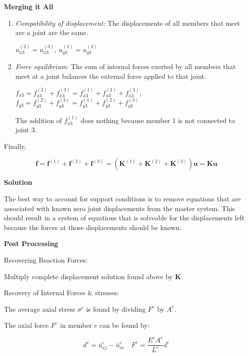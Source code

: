 \documentclass{article}
\begin{document}
\begin{multicols*}{2}
    \textbf{Merging it All}\par 
    \begin{enumerate}
        \item \textit{Compatibility of displacement:} The displacements of all 
                members that meet are a joint are the same.\par
                $u_{x3}^{(2)} = u_{x3}^{(3)}$, $u_{y3}^{(2)} = u_{y3}^{(3)}$
        \item \textit{Force equilibrium:} The sum of internal forces exerted by 
                all members that meet at a joint balances the external force 
                applied to that joint.\par 
                $f_{x3} = f_{x3}^{(2)}+f_{x3}^{(3)}=f_{x3}^{(1)}+f_{x3}^{(2)}+f_{x3}^{(3)}$, 
                $f_{y3} = f_{y3}^{(2)}+f_{y3}^{(3)}=f_{y3}^{(1)}+f_{y3}^{(2)}+f_{y3}^{(3)}$\par
                The addition of $f_{x3}^{(1)}$ does nothing because member 1 is
                not connected to joint 3.
    \end{enumerate}

    Finally, \par 
    $$\textbf{f} = \textbf{f}^{(1)}+\textbf{f}^{(2)}+\textbf{f}^{(3)}=\left(\textbf{K}^{(1)}+\textbf{K}^{(2)}+\textbf{K}^{(3)}\right)\textbf{u} = \textbf{Ku}$$

    \textbf{Solution}

    The best way to account for support conditions is to remove equations that
    are associated with known zero joint displacements from the master system.
    This should result in a system of equations that is solveable for the displacements
    left because the forces at those displacements should be known.

    \textbf{Post Processing}

    Recovering Reaction Forces:\par 
    Multiply complete displacement solution found above by \textbf{K}.\par 
    Recovery of Internal Forces \& stresses:\par 
    The average axial stress $\sigma^e$ is found by dividing $F^e$ by $A^e$.\par 
    The axial force $F^e$ in member $e$ can be found by:\par 
    \begin{equation*}
        d^e=\bar{u}_{xj}^e-\bar{u}_{xi}^e
        \quad
        F^e=\frac{E^eA^e}{L^e}d^e
    \end{equation*}


\end{multicols*}
\end{document}

